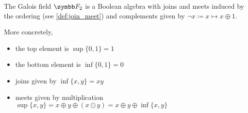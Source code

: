 \begin{theorem}\label{thm:f2_is_boolean_algebra}
  The Galois field \( \F_2 \) is a Boolean algebra with joins and meets induced by the ordering (see \cref{def:join_meet}) and complements given by \( \neg x \coloneqq x \mapsto x \oplus 1 \).

  More concretely,
  \begin{itemize}
    \item the top element is \( \sup \{ 0, 1 \} = 1 \)
    \item the bottom element is \( \inf \{ 0, 1 \} = 0 \)
    \item joins given by \( \inf \{ x, y \} = xy \)
    \item meets given by multiplication \( \sup \{ x, y \} = x \oplus y \oplus (x \odot y) = x \oplus y \oplus \inf \{ x, y \} \)
  \end{itemize}
\end{theorem}
